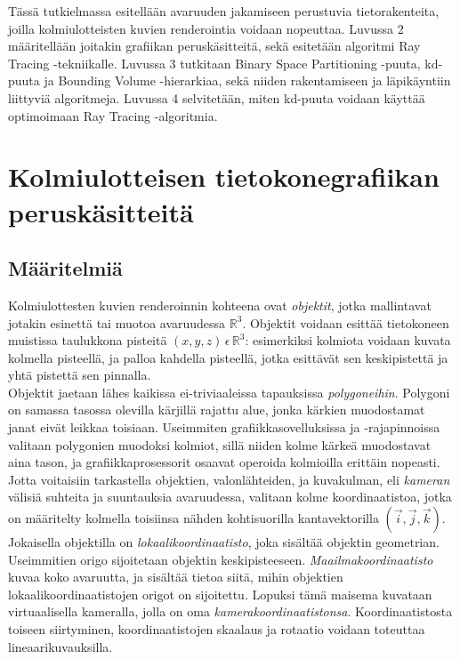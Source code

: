 \documentclass[a4paper,12pt, titlepage]{article}
\theoremstyle{break}
\newcommand{\R}{\mathbb{R}}
\begin{document}
Tässä tutkielmassa esitellään avaruuden jakamiseen perustuvia tietorakenteita, joilla kolmiulotteisten kuvien renderointia voidaan nopeuttaa. Luvussa 2 määritellään joitakin grafiikan peruskäsitteitä, sekä esitetään algoritmi Ray Tracing -tekniikalle. Luvussa 3 tutkitaan Binary Space Partitioning -puuta, kd-puuta ja Bounding Volume -hierarkiaa, sekä niiden rakentamiseen ja läpikäyntiin liittyviä algoritmeja. Luvussa 4 selvitetään, miten kd-puuta voidaan käyttää optimoimaan Ray Tracing -algoritmia.


\newpage
\section{Kolmiulotteisen tietokonegrafiikan peruskäsitteitä}
\subsection{Määritelmiä}

Kolmiulottesten kuvien renderoinnin kohteena ovat \emph{objektit}, jotka mallintavat jotakin esinettä tai muotoa avaruudessa $\R^3$. Objektit voidaan esittää tietokoneen muistissa taulukkona pisteitä $(x,y,z)\,\epsilon\,\R^3$: esimerkiksi kolmiota voidaan kuvata kolmella pisteellä, ja palloa kahdella pisteellä, jotka esittävät sen keskipistettä ja yhtä pistettä sen pinnalla.\cite{angel}\\

Objektit jaetaan lähes kaikissa ei-triviaaleissa tapauksissa \emph{polygoneihin}. Polygoni on samassa tasossa olevilla kärjillä rajattu alue, jonka kärkien muodostamat janat eivät leikkaa toisiaan. Useimmiten grafiikkasovelluksissa ja -rajapinnoissa valitaan polygonien muodoksi kolmiot, sillä niiden kolme kärkeä muodostavat aina tason, ja grafiikkaprosessorit osaavat operoida kolmioilla erittäin nopeasti.\cite{angel}\\

Jotta voitaisiin tarkastella objektien, valonlähteiden, ja kuvakulman, eli \emph{kameran} välisiä suhteita ja suuntauksia avaruudessa, valitaan kolme koordinaatistoa, jotka on määritelty kolmella toisiinsa nähden kohtisuorilla kantavektorilla $(\vec{i},\vec{j},\vec{k})$. Jokaisella objektilla on \emph{lokaalikoordinaatisto}, joka sisältää objektin geometrian. Useimmitien origo sijoitetaan objektin keskipisteeseen. \emph{Maailmakoordinaatisto} kuvaa koko avaruutta, ja sisältää tietoa siitä, mihin objektien lokaalikoordinaatistojen origot on sijoitettu. Lopuksi tämä maisema kuvataan virtuaalisella kameralla, jolla on oma \emph{kamerakoordinaatistonsa}. Koordinaatistosta toiseen siirtyminen, koordinaatistojen skaalaus ja rotaatio voidaan toteuttaa lineaarikuvauksilla.\cite{janke}
\end{document}
